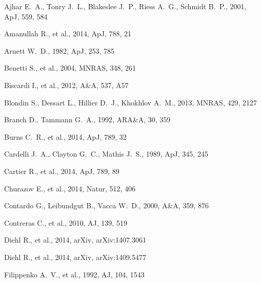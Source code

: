 \begin{thebibliography}{99}
Ajhar E.~A., Tonry J.~L., Blakeslee J.~P., Riess A.~G., Schmidt B.~P., 
2001, ApJ, 559, 584 

 Amanullah R., et al., 2014, ApJ, 788, 21

 Arnett 
W.~D., 1982, ApJ, 253, 785 



 Benetti S., et al., 2004, MNRAS, 348, 261


 Biscardi I., et al., 2012, A\&A, 537, A57 

 Blondin S., Dessart L., Hillier D.~J., 
Khokhlov A.~M., 2013, MNRAS, 429, 2127 

 Branch D., Tammann G.~A., 1992, ARA\&A, 30, 359 


 Burns
C.~R., et al., 2014, ApJ, 789, 32 

 Cardelli J.~A., Clayton G.~C.,
Mathis J.~S., 1989, ApJ, 345, 245 

 Cartier R., et al., 2014, ApJ, 789, 89

 Churazov E., et al., 2014, Natur, 
512, 406

 Contardo G., Leibundgut B., Vacca W.~D., 2000, A\&A, 359, 876 

 Contreras C., et al., 2010, AJ, 139, 519 

Diehl R., et al., 2014, arXiv, arXiv:1407.3061 

Diehl R., et al., 2014, arXiv, arXiv:1409.5477 

 Filippenko A.~V., et al., 1992, AJ, 104,
1543 


\end{thebibliography}
